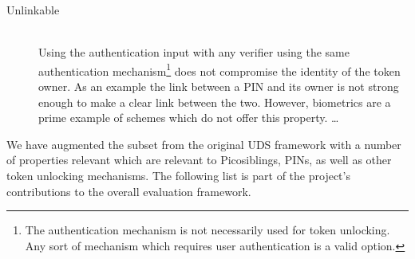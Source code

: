 \begin{description}
  \item[Unlinkable] \hfill \\
  Using the authentication input with any verifier using the same authentication mechanism\footnote{The authentication mechanism is not necessarily used for token unlocking. Any sort of mechanism which requires user authentication is a valid option.} does not compromise the identity of the token owner. As an example the link between a PIN and its owner is not strong enough to make a clear link between the two. However, biometrics are a prime example of schemes which do not offer this property. \ldots
  
\end{description}

We have augmented the subset from the original UDS framework with a number of properties relevant which are relevant to Picosiblings, PINs, as well as other token unlocking mechanisms. The following list is part of the project's contributions to the overall evaluation framework.

